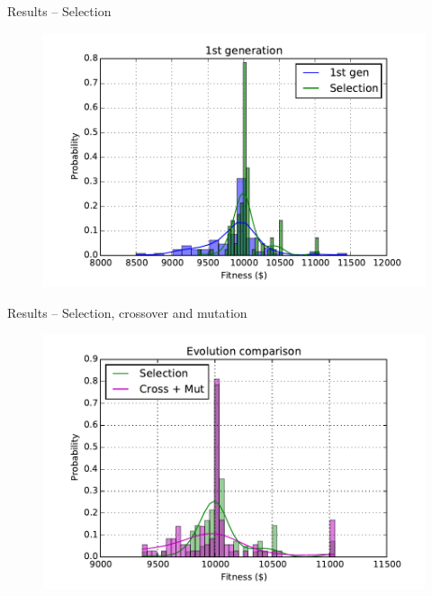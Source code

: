 \documentclass[12pt,portuguese]{beamer}
\begin{document}
\begin{frame}{Results -- Selection}
	\begin{figure}[h]
	\centering
	\includegraphics[width=0.9\columnwidth]{images/01r_100_sel1.pdf}
	\end{figure}
\end{frame}

\begin{frame}{Results -- Selection, crossover and mutation}
	\begin{figure}[h]
	\centering
	\includegraphics[width=0.9\columnwidth]{images/sel_x_cross_mut.pdf}
	\end{figure}
\end{frame}
\end{document}
